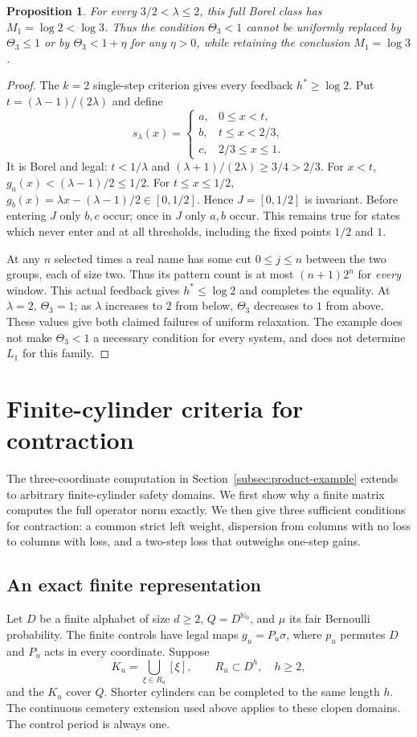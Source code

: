 \documentclass[11pt,reqno]{amsart}
\numberwithin{equation}{section}
\newtheorem{proposition}[theorem]{Proposition}
\theoremstyle{definition}
\theoremstyle{definition}
\newcommand{\Nzero}{\mathbb N_0}
\begin{document}
\begin{proposition}\label{prop:critical}
For every $3/2<\lambda\le2$, this full Borel class has
$M_1=\log2<\log3$. Thus the condition $\Theta_3<1$ cannot be
uniformly replaced by $\Theta_3\le1$ or by
$\Theta_3<1+\eta$ for any $\eta>0$, while retaining the
conclusion $M_1=\log3$.
\end{proposition}
\begin{proof}
The $k=2$ single-step criterion gives every feedback
$h^*\ge\log2$. Put $t=(\lambda-1)/(2\lambda)$ and define
\[
 s_\lambda(x)=\begin{cases}
 a,&0\le x<t,\\ b,&t\le x<2/3,\\ c,&2/3\le x\le1.
 \end{cases}
\]
It is Borel and legal: $t<1/\lambda$ and
$(\lambda+1)/(2\lambda)\ge3/4>2/3$.
For $x<t$, $g_a(x)<(\lambda-1)/2\le1/2$.
For $t\le x\le1/2$,
$g_b(x)=\lambda x-(\lambda-1)/2\in[0,1/2]$.
Hence $J=[0,1/2]$ is invariant. Before entering $J$ only
$b,c$ occur; once in $J$ only $a,b$ occur. This remains true
for states which never enter and at all thresholds, including the
fixed points $1/2$ and $1$.

At any $n$ selected times a real name has some cut $0\le j\le n$
between the two groups, each of size two. Thus its pattern count
is at most $(n+1)2^n$ for \emph{every} window. This actual
feedback gives $h^*\le\log2$ and completes the equality.
At $\lambda=2$, $\Theta_3=1$; as $\lambda$ increases to $2$
from below, $\Theta_3$ decreases to $1$ from above. These values
give both claimed failures of uniform relaxation. The example
does not make $\Theta_3<1$ a necessary condition for every
system, and does not determine $L_1$ for this family.
\end{proof}

\section{Finite-cylinder criteria for contraction}\label{sec:cylinder}

The three-coordinate computation in Section~\ref{subsec:product-example}
extends to arbitrary finite-cylinder safety domains. We first show
why a finite matrix computes the full operator norm exactly. We then
give three sufficient conditions for contraction: a common strict
left weight, dispersion from columns with no loss to columns with
loss, and a two-step loss that outweighs one-step gains.

\subsection{An exact finite representation}
Let $D$ be a finite alphabet of size $d\ge2$, $Q=D^{\Nzero}$,
and $\mu$ its fair Bernoulli probability. The finite controls have
legal maps $g_u=P_u\sigma$, where $p_u$ permutes $D$ and $P_u$
acts in every coordinate. Suppose
\[
 K_u=\bigcup_{\xi\in R_u}[\xi],\qquad R_u\subset D^h,
 \quad h\ge2,
\]
and the $K_u$ cover $Q$. Shorter cylinders can be completed to the
same length $h$. The continuous cemetery extension used above
applies to these clopen domains. The control period is always one.
\end{document}
